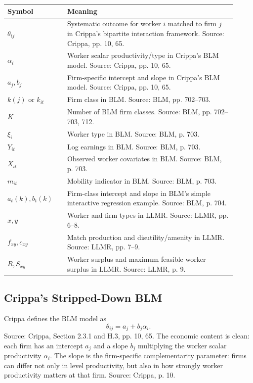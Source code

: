 \documentclass[11pt]{article}
\begin{document}
\begin{center}
\begin{tabular}{>{\raggedright\arraybackslash}p{0.24\linewidth}
                >{\raggedright\arraybackslash}p{0.68\linewidth}}
\toprule
Symbol & Meaning \\
\midrule
$\theta_{ij}$ & Systematic outcome for worker $i$ matched to firm $j$ in Crippa's bipartite interaction framework. Source: Crippa, pp. 10, 65. \\
$\alpha_i$ & Worker scalar productivity/type in Crippa's BLM model. Source: Crippa, pp. 10, 65. \\
$a_j,b_j$ & Firm-specific intercept and slope in Crippa's BLM model. Source: Crippa, pp. 10, 65. \\
$k(j)$ or $k_{it}$ & Firm class in BLM. Source: BLM, pp. 702--703. \\
$K$ & Number of BLM firm classes. Source: BLM, pp. 702--703, 712. \\
$\xi_i$ & Worker type in BLM. Source: BLM, p. 703. \\
$Y_{it}$ & Log earnings in BLM. Source: BLM, p. 703. \\
$X_{it}$ & Observed worker covariates in BLM. Source: BLM, p. 703. \\
$m_{it}$ & Mobility indicator in BLM. Source: BLM, p. 703. \\
$a_t(k),b_t(k)$ & Firm-class intercept and slope in BLM's simple interactive regression example. Source: BLM, p. 704. \\
$x,y$ & Worker and firm types in LLMR. Source: LLMR, pp. 6--8. \\
$f_{xy},c_{xy}$ & Match production and disutility/amenity in LLMR. Source: LLMR, pp. 7--9. \\
$R,S_{xy}$ & Worker surplus and maximum feasible worker surplus in LLMR. Source: LLMR, p. 9. \\
\bottomrule
\end{tabular}
\end{center}

\subsection{Crippa's Stripped-Down BLM}

Crippa defines the BLM model as
\[
\theta_{ij}=a_j+b_j\alpha_i.
\]
Source: Crippa, Section 2.3.1 and H.3, pp. 10, 65. The economic content is clean:
each firm has an intercept $a_j$ and a slope $b_j$ multiplying the worker scalar
productivity $\alpha_i$. The slope is the firm-specific complementarity parameter:
firms can differ not only in level productivity, but also in how strongly worker
productivity matters at that firm. Source: Crippa, p. 10.
\end{document}
